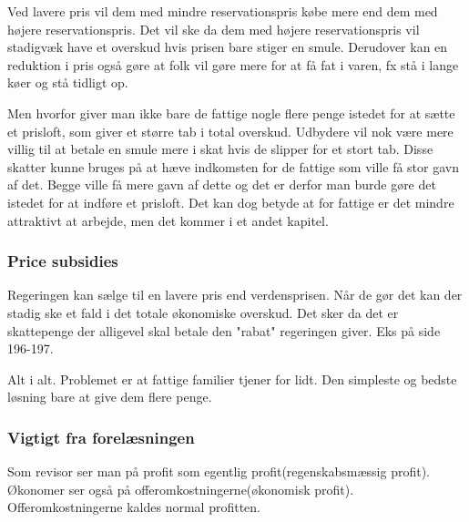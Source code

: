Ved lavere pris vil dem med mindre reservationspris købe mere end dem med højere reservationspris. Det vil ske da dem med højere reservationspris vil stadigvæk have et overskud hvis prisen bare stiger en smule. Derudover kan en reduktion i pris også gøre at folk vil gøre mere for at få fat i varen, fx stå i lange køer og stå tidligt op. 

Men hvorfor giver man ikke bare de fattige nogle flere penge istedet for at sætte et prisloft, som giver et større tab i total overskud. Udbydere vil nok være mere villig til at betale en smule mere i skat hvis de slipper for et stort tab. Disse skatter kunne bruges på at hæve indkomsten for de fattige som ville få stor gavn af det. Begge ville få mere gavn af dette og det er derfor man burde gøre det istedet for at indføre et prisloft. 
Det kan dog betyde at for fattige er det mindre attraktivt at arbejde, men det kommer i et andet kapitel.

\subsubsection{Price subsidies}
Regeringen kan sælge til en lavere pris end verdensprisen. Når de gør det kan der stadig ske et fald i det totale økonomiske overskud. Det sker da det er skattepenge der alligevel skal betale den "rabat" regeringen giver. Eks på side 196-197.

Alt i alt. Problemet er at fattige familier tjener for lidt. Den simpleste og bedste løsning bare at give dem flere penge. 

\subsubsection{Vigtigt fra forelæsningen}
Som revisor ser man på profit som egentlig profit(regenskabsmæssig profit). Økonomer ser også på offeromkostningerne(økonomisk profit). Offeromkostningerne kaldes normal profitten. 






